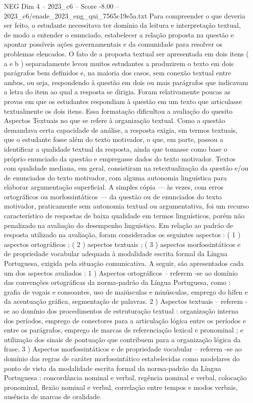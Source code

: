\begin{textsample}{NEG Dim 4 – 2023\_c6 – Score -8.00 – 2023\_c6/enade\_2023\_eng\_qui\_7565c19e5a.txt}
Para compreender o que deveria ser feito, o estudante necessitava ter domínio da leitura e interpretação textual, de modo a entender o enunciado, estabelecer a relação proposta na questão e apontar possíveis ações governamentais e da comunidade para resolver os problemas elencados.
O fato de a proposta textual ser apresentada em dois itens ( a e b ) separadamente levou muitos estudantes a produzirem o texto em dois parágrafos bem definidos e, na maioria dos casos, sem conexão textual entre ambos, ou seja, respondendo à questão em dois ou mais parágrafos que indicavam a letra do item ao qual a resposta se dirigia.
Foram relativamente poucas as provas em que os estudantes respondiam à questão em um texto que articulasse textualmente os dois itens.
Essa formatação dificultou a avaliação do quesito Aspectos Textuais no que se refere à organização textual.
Como a questão demandava certa capacidade de análise, a resposta exigia, em termos textuais, que o estudante fosse além do texto motivador, o que, em parte, passou a identificar a qualidade textual da resposta, ainda que tomasse como base o próprio enunciado da questão e empregasse dados do texto motivador.
Textos com qualidade mediana, em geral, consistiram na retextualização da questão e/ou de enunciados do texto motivador, com alguma autonomia linguística para elaborar argumentação superficial.
A simples cópia — às vezes, com erros ortográficos ou morfossintáticos — da questão ou de enunciados do texto motivador, praticamente sem autonomia textual ou argumentativa, foi um recurso característico de respostas de baixa qualidade em termos linguísticos, porém não penalizado na avaliação do desempenho linguístico.
Em relação ao padrão de resposta utilizado na avaliação, foram considerados os seguintes aspectos : ( 1 ) aspectos ortográficos ; ( 2 ) aspectos textuais ; ( 3 ) aspectos morfossintáticos e de propriedade vocabular adequada à modalidade escrita formal da Língua Portuguesa, exigida pela situação comunicativa.
A seguir, são apresentados cada um dos aspectos avaliados : 1 ) Aspectos ortográficos – referem -se ao domínio das convenções ortográficas da norma-padrão da Língua Portuguesa, como : grafia de vogais e consoantes, uso de maiúsculas e minúsculas, emprego do hífen e da acentuação gráfica, segmentação de palavras. 2 ) Aspectos textuais – referem -se ao domínio dos procedimentos de estruturação textual : organização interna dos períodos, emprego de conectores para a articulação lógica entre os períodos e entre os parágrafos, emprego de marcas de referenciação lexical e pronominal ; e utilização dos sinais de pontuação que contribuem para a organização lógica da frase. 3 ) Aspectos morfossintáticos e de propriedade vocabular – referem -se ao domínio das regras de caráter morfossintático estabelecidas como modelares do ponto de vista da modalidade escrita formal da norma-padrão da Língua Portuguesa : concordância nominal e verbal, regência nominal e verbal, colocação pronominal, flexão nominal e verbal, correlação entre tempos e modos verbais, ausência de marcas de oralidade.

\end{textsample}
